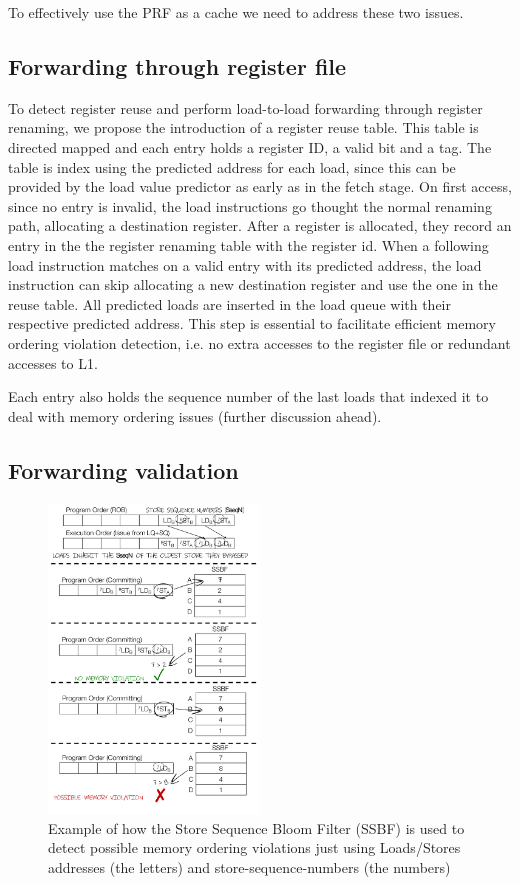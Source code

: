 \documentclass{sig-alternate}
\begin{document}
To effectively use the PRF as a cache we need to address these two issues.

\subsection{Forwarding through register file}
To detect register reuse and perform load-to-load forwarding through register renaming, we propose the introduction of a register reuse table. This table is directed mapped and each entry holds a register ID, a valid bit and a tag. The table is index using the predicted address for each load, since this can be provided by the load value predictor as early as in the fetch stage. On first access, since no entry is invalid, the load instructions go thought the normal renaming path, allocating a destination register. After a register is allocated, they record an entry in the the register renaming table with the register id. When a following load instruction matches on a valid entry with its predicted address, the load instruction can skip allocating a new destination register and use the one in the reuse table. All predicted loads are inserted in the load queue with their respective predicted address. This step is essential to facilitate efficient memory ordering violation detection, i.e. no extra accesses to the register file or redundant accesses to L1.



Each entry also holds the sequence number of the last loads that indexed it to deal with memory ordering issues (further discussion ahead).

\subsection{Forwarding validation}
\begin{figure}[ht]
\centerline{\includegraphics[width=0.50\textwidth]{diagrams/MemOrdValidation.pdf}}
\caption{Example of how the Store Sequence Bloom Filter (SSBF) is used to detect possible memory ordering violations just using Loads/Stores addresses (the letters) and store-sequence-numbers (the numbers)}
\label{fig:MemOrdValidation}
\end{figure}
\end{document}
